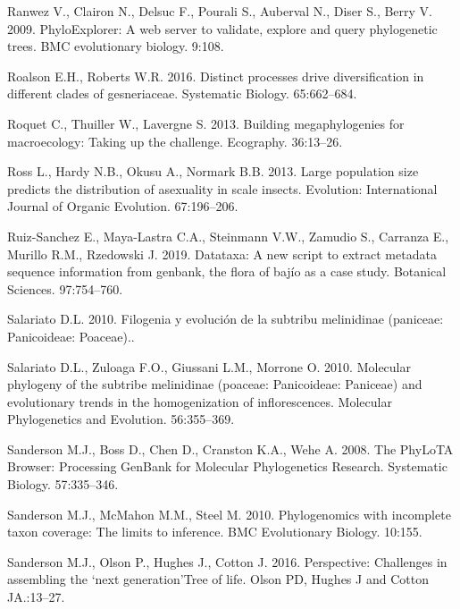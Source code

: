 \documentclass[]{article}
\begin{document}
\leavevmode\hypertarget{ref-ranwez2009phyloexplorer}{}%
Ranwez V., Clairon N., Delsuc F., Pourali S., Auberval N., Diser S., Berry V. 2009. PhyloExplorer: A web server to validate, explore and query phylogenetic trees. BMC evolutionary biology. 9:108.

\leavevmode\hypertarget{ref-roalson2016distinct}{}%
Roalson E.H., Roberts W.R. 2016. Distinct processes drive diversification in different clades of gesneriaceae. Systematic Biology. 65:662--684.

\leavevmode\hypertarget{ref-roquet2013building}{}%
Roquet C., Thuiller W., Lavergne S. 2013. Building megaphylogenies for macroecology: Taking up the challenge. Ecography. 36:13--26.

\leavevmode\hypertarget{ref-ross2013large}{}%
Ross L., Hardy N.B., Okusu A., Normark B.B. 2013. Large population size predicts the distribution of asexuality in scale insects. Evolution: International Journal of Organic Evolution. 67:196--206.

\leavevmode\hypertarget{ref-ruiz2019datataxa}{}%
Ruiz-Sanchez E., Maya-Lastra C.A., Steinmann V.W., Zamudio S., Carranza E., Murillo R.M., Rzedowski J. 2019. Datataxa: A new script to extract metadata sequence information from genbank, the flora of bajío as a case study. Botanical Sciences. 97:754--760.

\leavevmode\hypertarget{ref-salariato2010filogenia}{}%
Salariato D.L. 2010. Filogenia y evolución de la subtribu melinidinae (paniceae: Panicoideae: Poaceae)..

\leavevmode\hypertarget{ref-salariato2010molecular}{}%
Salariato D.L., Zuloaga F.O., Giussani L.M., Morrone O. 2010. Molecular phylogeny of the subtribe melinidinae (poaceae: Panicoideae: Paniceae) and evolutionary trends in the homogenization of inflorescences. Molecular Phylogenetics and Evolution. 56:355--369.

\leavevmode\hypertarget{ref-sanderson2008phylota}{}%
Sanderson M.J., Boss D., Chen D., Cranston K.A., Wehe A. 2008. The PhyLoTA Browser: Processing GenBank for Molecular Phylogenetics Research. Systematic Biology. 57:335--346.

\leavevmode\hypertarget{ref-sanderson2010phylogenomics}{}%
Sanderson M.J., McMahon M.M., Steel M. 2010. Phylogenomics with incomplete taxon coverage: The limits to inference. BMC Evolutionary Biology. 10:155.

\leavevmode\hypertarget{ref-sanderson2016perspective}{}%
Sanderson M.J., Olson P., Hughes J., Cotton J. 2016. Perspective: Challenges in assembling the `next generation'Tree of life. Olson PD, Hughes J and Cotton JA.:13--27.
\end{document}

